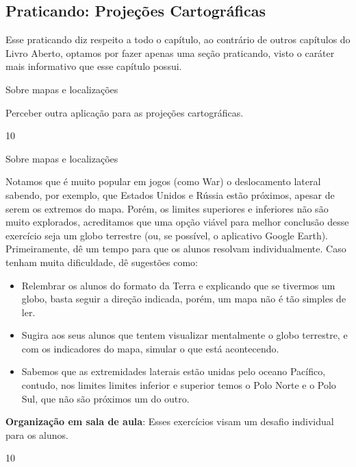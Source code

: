 \begin{texto}
{ 
  \section{Praticando: Projeções Cartográficas}
  Esse praticando diz respeito a todo o capítulo, ao contrário de outros capítulos do Livro Aberto, optamos por fazer apenas uma seção praticando, visto o caráter mais informativo que esse capítulo possui.
}
\end{texto}
\begin{objectives}{Sobre mapas e localizações}
{ Perceber outra aplicação para as projeções cartográficas.
  
}{1}{0}
\end{objectives}
\begin{sugestions}{Sobre mapas e localizações}
{
  Notamos que é muito popular em jogos (como War) o deslocamento lateral sabendo, por exemplo, que Estados Unidos e Rússia estão próximos, apesar de serem os extremos do mapa. Porém, os limites superiores e inferiores não são muito explorados, acreditamos que uma opção viável para melhor conclusão desse exercício seja um globo terrestre (ou, se possível, o aplicativo Google Earth).
  Primeiramente, dê um tempo para que os alunos resolvam individualmente. Caso tenham muita dificuldade, dê sugestões como:
  \begin{itemize}
  \item Relembrar os alunos do formato da Terra e explicando que se tivermos um globo, basta seguir a direção indicada, porém, um mapa não é tão simples de ler.
  \item Sugira aos seus alunos que tentem visualizar mentalmente o globo terrestre, e com os indicadores do mapa, simular o que está acontecendo.
  \item Sabemos que as extremidades laterais estão unidas pelo oceano Pacífico, contudo, nos limites limites inferior e superior temos o Polo Norte e o Polo Sul, que não são próximos um do outro.
  \end{itemize}

  \textbf{Organização em sala de aula}: Esses exercícios visam um desafio individual para os alunos.
}{1}{0}
\end{sugestions}
\clearmargin
